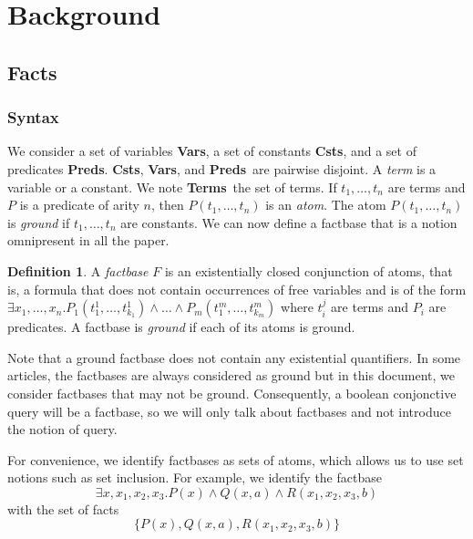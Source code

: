 \documentclass{article}
\theoremstyle{definition}
\newtheorem{definition}{Definition}[section]
\theoremstyle{remark}
\newcommand{\Vars}{\textbf{Vars}}
\newcommand{\Terms}{\textbf{Terms}}
\newcommand{\Preds}{\textbf{Preds}}
\newcommand{\Csts}{\textbf{Csts}}
\begin{document}
\section{Background}


\subsection{Facts}

\subsubsection{Syntax}

We consider a set of variables \Vars, a set of constants \Csts, and a set of predicates \Preds. \Csts, \Vars, and \Preds\ are pairwise disjoint. A \emph{term} is a variable or a constant. We note \Terms\ the set of terms. If $t_1,\ldots,t_n$ are terms and $P$ is a predicate of arity $n$, then $P(t_{1},\ldots,t_{n})$ is an \emph{atom}. The atom $P(t_{1},\ldots,t_{n})$ is \emph{ground} if $t_1,\ldots,t_n$ are constants. We can now define a factbase that is a notion omnipresent in all the paper.  


\begin{definition}
A \emph{factbase} $F$ is an existentially closed conjunction of atoms, that is, a formula that does not contain occurrences of free variables and is of the form $\exists x_{1},\ldots,x_{n}.P_{1}(t_{1}^{1},\ldots,t_{k_{1}}^{1})\land \ldots\land P_{m}(t_{1}^{m},\ldots,t_{k_{m}}^{m})$ where $t_i^j$ are terms and $P_i$ are predicates. A factbase is \emph{ground} if each of its atoms is ground.
\end{definition}

Note that a ground factbase does not contain any  existential quantifiers. In some articles, the factbases are always considered as ground but in this document, we consider factbases that may not be ground. Consequently, a boolean conjonctive query will be a factbase, so we will only talk about factbases and not introduce the notion of query.

For convenience, we identify factbases as sets of atoms, which allows us to  use  set  notions  such  as  set inclusion. For example, we identify the factbase $$\exists x,x_{1},x_{2},x_{3}. P(x) \land Q(x,a) \land R(x_{1},x_{2},x_{3},b)$$ with the set of facts $$\{P(x),Q(x,a),R(x_{1},x_{2},x_{3},b)\}$$
\end{document}
